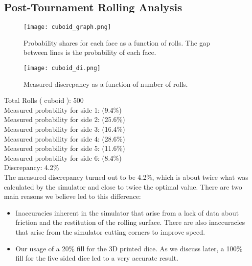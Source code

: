 \subsection{Post-Tournament Rolling Analysis}
\begin{figure}[h]
\center
\texttt{[image: cuboid\_graph.png]}
\caption{Probability shares for each face as a function of rolls. The gap between lines is the probability of each face.}
\label{fig:cuboid}
\end{figure}
\begin{figure}[h]
\center
\texttt{[image: cuboid\_di.png]}
\caption{Measured discrepancy as a function of number of rolls.}
\label{fig:cuboidd}
\end{figure}
Total Rolls ( cuboid ): 500\\
Measured probability for side 1: (9.4\%)\\
Measured probability for side 2: (25.6\%)\\
Measured probability for side 3: (16.4\%)\\
Measured probability for side 4: (28.6\%)\\
Measured probability for side 5: (11.6\%)\\
Measured probability for side 6: (8.4\%)\\
Discrepancy: 4.2\%\\
The measured discrepancy turned out to be 4.2\%, which is about twice what was calculated by the simulator and close to twice the optimal value. There are two main reasons we believe led to this difference:\\
\begin{itemize}
    \item Inaccuracies inherent in the simulator that arise from a lack of data about friction and the restitution of the rolling surface. There are also inaccuracies that arise from the simulator cutting corners to improve speed.\\
    \item Our usage of a 20\% fill for the 3D printed dice. As we discuss later, a 100\% fill for the five sided dice led to a very accurate result.
\end{itemize}
